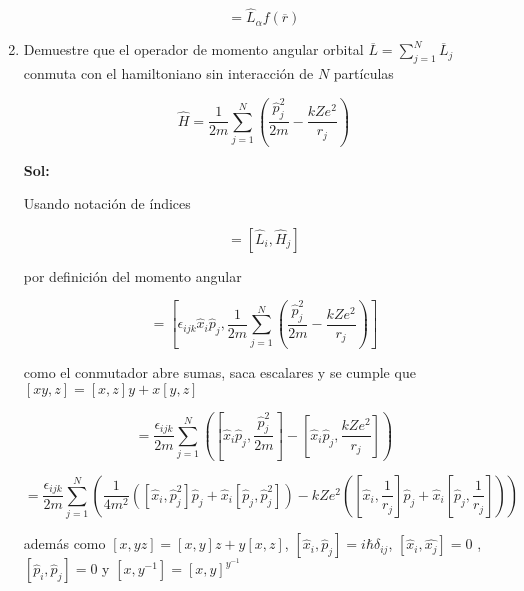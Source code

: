 \documentclass[12pt,a4paper]{article}
\begin{document}
\begin{enumerate}
\begin{equation*}
    = \hat{L}_\alpha f(\overline{r})
\end{equation*}








\item Demuestre que el operador de momento angular orbital $\overline{L} = \sum_{j=1}^{N} \overline{L}_j$ conmuta con el hamiltoniano sin interacción de $N$ partículas

\begin{equation*}
    \hat{H} = \frac{1}{2m} \sum_{j=1}^{N} \left(\frac{\hat{p}_{j}^{2}}{2m} - \frac{kZ e^2}{r_j}\right)
\end{equation*}

\textbf{Sol:}

Usando notación de índices

\begin{equation*}
    [\hat{L}, \hat{H}] = [\hat{L}_i, \hat{H}_j]
\end{equation*}

por definición del momento angular

\begin{equation*}
    [\hat{L}_i, \hat{H}_j] =\left[\epsilon_{ijk} \hat{x}_i \hat{p}_j,\frac{1}{2m} \sum_{j=1}^{N} \left(\frac{\hat{p}_{j}^{2}}{2m} - \frac{kZ e^2}{r_j}\right)\right]
\end{equation*}

como el conmutador abre sumas, saca escalares y se cumple que $[xy,z] = [x,z]y + x[y,z] $


\begin{equation*}
    [\hat{L}_i, \hat{H}_j] =\frac{\epsilon_{ijk}}{2m} \sum_{j=1}^{N}\left( \left[\hat{x}_i \hat{p}_j,\frac{\hat{p}_{j}^{2}}{2m} \right] - \left[\hat{x}_i \hat{p}_j,\frac{kZ e^2}{r_j}\right]\right)
\end{equation*}


\begin{equation*}
    =\frac{\epsilon_{ijk}}{2m} \sum_{j=1}^{N}\left(\frac{1}{4m^2} \left(\left[\hat{x}_i ,\hat{p}_{j}^{2} \right] \hat{p}_j +\hat{x}_i  \left[\hat{p}_j,\hat{p}_{j}^{2} \right] \right) -kZe^2\left( \left[\hat{x}_i ,\frac{1}{r_j}\right]\hat{p}_j +\hat{x}_i \left[ \hat{p}_j,\frac{1}{r_j}\right]\right)\right)
\end{equation*}

además como $[x,yz] = [x,y]z + y[x,z]$, $[\hat{x}_i, \hat{p}_j] = i \hbar \delta_{ij}$, $[\hat{x}_i,\hat{x_j}] =0$ , $[\hat{p}_i, \hat{p}_j] = 0$ y $[x,y^{-1}] = [x,y]^{y^{-1}}$
 


\end{enumerate}
\end{document}
